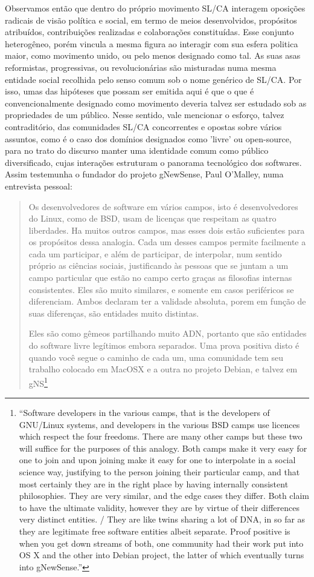 Observamos então que dentro do próprio movimento SL/CA interagem oposições radicais de visão política e social, em termo de meios desenvolvidos, propósitos atribuídos, contribuições realizadas e colaborações constituídas. Esse conjunto heterogêneo, porém vincula a mesma figura ao interagir com sua esfera politica maior, como movimento unido, ou pelo menos designado como tal. As suas asas reformistas, progressivas, ou revolucionárias são misturadas numa mesma entidade social recolhida pelo senso comum sob o nome genérico de SL/CA. Por isso, umas das hipóteses que possam ser emitida aqui é que o que é convencionalmente designado como movimento deveria talvez ser estudado sob as propriedades de um público. Nesse sentido, vale mencionar o esforço, talvez contraditório, das comunidades SL/CA concorrentes e opostas sobre vários assuntos, como é o caso dos domínios designados como 'livre' ou open-source, para no trato do discurso manter uma identidade comum como público diversificado, cujas interações estruturam o panorama tecnológico dos softwares. Assim testemunha o fundador do projeto gNewSense, Paul O'Malley, numa entrevista pessoal:

\begin{quote}
Os desenvolvedores de software em vários campos, isto é desenvolvedores do Linux, como de BSD, usam de licenças que respeitam as quatro liberdades. Ha muitos outros campos, mas esses dois estão suficientes para os propósitos dessa analogia. Cada um desses campos permite facilmente a cada um participar, e além de participar, de interpolar, num sentido próprio as ciências sociais, justificando às pessoas que se juntam a um campo particular que estão no campo certo graças as filosofias internas consistentes. Eles são muito similares, e somente em casos periféricos se diferenciam. Ambos declaram ter a validade absoluta, porem em função de suas diferenças, são entidades muito distintas.

Eles são como gêmeos partilhando muito ADN, portanto que são entidades do software livre legítimos embora separados. Uma prova positiva disto é quando você segue o caminho de cada um, uma comunidade tem seu trabalho colocado em MacOSX e a outra no projeto Debian, e talvez em gNS\footnote{“Software developers in the various camps, that is the developers of GNU/Linux systems, and developers in the various BSD camps use licences which respect the four freedoms. There are many other camps but these two will suffice for the purposes of this analogy. Both camps make it very easy for one to join and upon joining make it easy for one to interpolate in a social science way, justifying to the person joining their particular camp, and that most certainly they are in the right place by having internally consistent philosophies.  They are very similar, and the edge cases they differ. Both claim to have the ultimate validity, however they are by virtue of their differences very distinct entities. / They are like twins sharing a lot of DNA, in so far as they are legitimate free software entities albeit separate. Proof positive is when you get down streams of both, one community had their work put into OS X and the other into Debian project, the latter of which eventually turns into gNewSense.”}
\end{quote}

